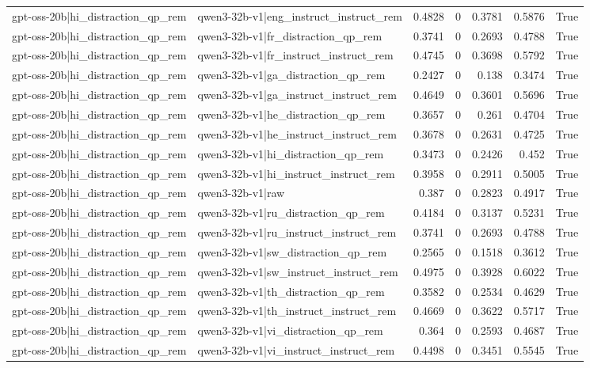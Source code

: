 \begin{table}
\begin{tabular}{l l r r r r l}
gpt-oss-20b|hi_distraction_qp_rem & qwen3-32b-v1|eng_instruct_instruct_rem & 0.4828 & 0 & 0.3781 & 0.5876 & True \\
gpt-oss-20b|hi_distraction_qp_rem & qwen3-32b-v1|fr_distraction_qp_rem & 0.3741 & 0 & 0.2693 & 0.4788 & True \\
gpt-oss-20b|hi_distraction_qp_rem & qwen3-32b-v1|fr_instruct_instruct_rem & 0.4745 & 0 & 0.3698 & 0.5792 & True \\
gpt-oss-20b|hi_distraction_qp_rem & qwen3-32b-v1|ga_distraction_qp_rem & 0.2427 & 0 & 0.138 & 0.3474 & True \\
gpt-oss-20b|hi_distraction_qp_rem & qwen3-32b-v1|ga_instruct_instruct_rem & 0.4649 & 0 & 0.3601 & 0.5696 & True \\
gpt-oss-20b|hi_distraction_qp_rem & qwen3-32b-v1|he_distraction_qp_rem & 0.3657 & 0 & 0.261 & 0.4704 & True \\
gpt-oss-20b|hi_distraction_qp_rem & qwen3-32b-v1|he_instruct_instruct_rem & 0.3678 & 0 & 0.2631 & 0.4725 & True \\
gpt-oss-20b|hi_distraction_qp_rem & qwen3-32b-v1|hi_distraction_qp_rem & 0.3473 & 0 & 0.2426 & 0.452 & True \\
gpt-oss-20b|hi_distraction_qp_rem & qwen3-32b-v1|hi_instruct_instruct_rem & 0.3958 & 0 & 0.2911 & 0.5005 & True \\
gpt-oss-20b|hi_distraction_qp_rem & qwen3-32b-v1|raw & 0.387 & 0 & 0.2823 & 0.4917 & True \\
gpt-oss-20b|hi_distraction_qp_rem & qwen3-32b-v1|ru_distraction_qp_rem & 0.4184 & 0 & 0.3137 & 0.5231 & True \\
gpt-oss-20b|hi_distraction_qp_rem & qwen3-32b-v1|ru_instruct_instruct_rem & 0.3741 & 0 & 0.2693 & 0.4788 & True \\
gpt-oss-20b|hi_distraction_qp_rem & qwen3-32b-v1|sw_distraction_qp_rem & 0.2565 & 0 & 0.1518 & 0.3612 & True \\
gpt-oss-20b|hi_distraction_qp_rem & qwen3-32b-v1|sw_instruct_instruct_rem & 0.4975 & 0 & 0.3928 & 0.6022 & True \\
gpt-oss-20b|hi_distraction_qp_rem & qwen3-32b-v1|th_distraction_qp_rem & 0.3582 & 0 & 0.2534 & 0.4629 & True \\
gpt-oss-20b|hi_distraction_qp_rem & qwen3-32b-v1|th_instruct_instruct_rem & 0.4669 & 0 & 0.3622 & 0.5717 & True \\
gpt-oss-20b|hi_distraction_qp_rem & qwen3-32b-v1|vi_distraction_qp_rem & 0.364 & 0 & 0.2593 & 0.4687 & True \\
gpt-oss-20b|hi_distraction_qp_rem & qwen3-32b-v1|vi_instruct_instruct_rem & 0.4498 & 0 & 0.3451 & 0.5545 & True \\

\end{tabular}
\end{table}

